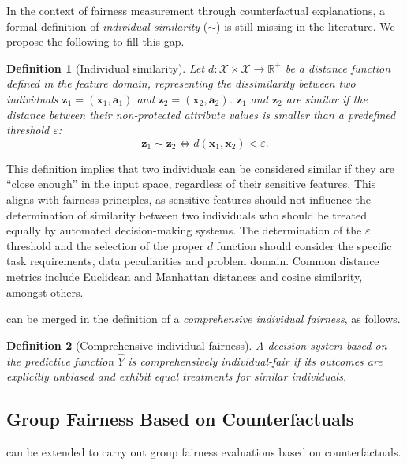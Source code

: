 \documentclass[letterpaper]{article} %
\newtheorem{definition}{Definition}
\begin{document}
In the context of fairness measurement through counterfactual explanations, a formal definition of \emph{individual similarity} ($\sim$) is still missing in the literature. We propose the following to fill this gap.
%
\begin{definition}[Individual similarity]\label{similar_individuals}
	Let $d: \mathcal{X} \times \mathcal{X} \rightarrow \mathbb{R}^{+}$ be a distance function defined in the feature domain, representing the dissimilarity between two individuals $\boldsymbol{z}_1 = (\boldsymbol{x}_1, \boldsymbol{a}_1)$ and $\boldsymbol{z}_2 = (\boldsymbol{x}_2, \boldsymbol{a}_2)$.
	$\boldsymbol{z}_1$ and $\boldsymbol{z}_2$ are similar if the distance between their non-protected attribute values is smaller than a predefined threshold $\varepsilon$:
	$$ \boldsymbol{z}_1 \sim \boldsymbol{z}_2 \iff d(\boldsymbol{x}_1, \boldsymbol{x}_2) < \varepsilon. $$
\end{definition}
%
\noindent This definition implies that two individuals can be considered similar if they are ``close enough'' in the input space, regardless of their sensitive features. This aligns with fairness principles, as sensitive features should not influence the determination of similarity between two individuals who should be treated equally by automated decision-making systems.
%
The determination of the $\varepsilon$ threshold and the selection of the proper $d$ function should consider the specific task requirements, data peculiarities and problem domain. Common distance metrics include Euclidean and Manhattan distances and cosine similarity, amongst others.

 can be merged in the definition of a \emph{comprehensive individual fairness}, as follows.
%
\begin{definition}[Comprehensive individual fairness]\label{comprehensive}
	A decision system based on the predictive function $\hat{Y}$ is \emph{comprehensively individual-fair} if its outcomes are explicitly unbiased and exhibit equal treatments for similar individuals.
\end{definition}

\subsection{Group Fairness Based on Counterfactuals}

 can be extended to carry out group fairness evaluations based on counterfactuals.
\end{document}
